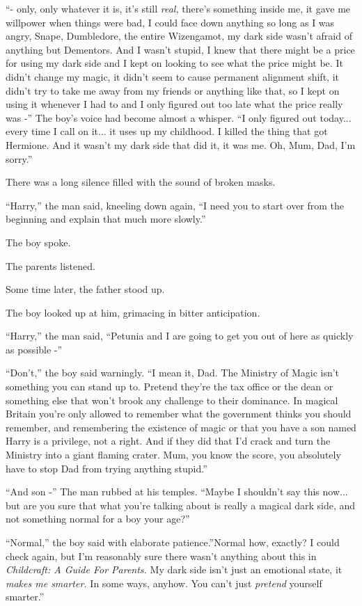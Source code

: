 ``- only, only whatever it is, it's still \emph{real,} there's something
inside me, it gave me willpower when things were bad, I could face down
anything so long as I was angry, Snape, Dumbledore, the entire
Wizengamot, my dark side wasn't afraid of anything but Dementors. And I
wasn't stupid, I knew that there might be a price for using my dark side
and I kept on looking to see what the price might be. It didn't change
my magic, it didn't seem to cause permanent alignment shift, it didn't
try to take me away from my friends or anything like that, so I kept on
using it whenever I had to and I only figured out too late what the
price really was -'' The boy's voice had become almost a whisper. ``I
only figured out today... every time I call on it... it uses
up my childhood. I killed the thing that got Hermione. And it wasn't my
dark side that did it, it was me. Oh, Mum, Dad, I'm sorry.''

There was a long silence filled with the sound of broken masks.

``Harry,'' the man said, kneeling down again, ``I need you to start over
from the beginning and explain that much more slowly.''

The boy spoke.

The parents listened.

Some time later, the father stood up.

The boy looked up at him, grimacing in bitter anticipation.

``Harry,'' the man said, ``Petunia and I are going to get you out of
here as quickly as possible -''

``Don't,'' the boy said warningly. ``I mean it, Dad. The Ministry of
Magic isn't something you can stand up to. Pretend they're the tax
office or the dean or something else that won't brook any challenge to
their dominance. In magical Britain you're only allowed to remember what
the government thinks you should remember, and remembering the existence
of magic or that you have a son named Harry is a privilege, not a right.
And if they did that I'd crack and turn the Ministry into a giant
flaming crater. Mum, you know the score, you absolutely have to stop Dad
from trying anything stupid.''

``And son -'' The man rubbed at his temples. ``Maybe I shouldn't say
this now... but are you sure that what you're talking about is
really a magical dark side, and not something normal for a boy your
age?''

``Normal,'' the boy said with elaborate patience.''Normal how, exactly?
I could check again, but I'm reasonably sure there wasn't anything about
this in \emph{Childcraft: A Guide For Parents.} My dark side isn't just
an emotional state, it \emph{makes me smarter.} In some ways, anyhow.
You can't just \emph{pretend} yourself smarter.''

